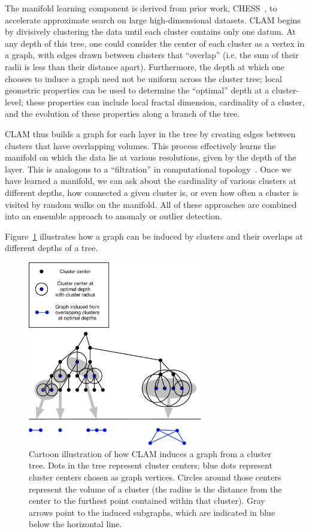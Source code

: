 The manifold learning component is derived from prior work, CHESS~\cite{ishaq2019entropy}, to accelerate approximate search on large high-dimensional datasets.
CLAM begins by divisively clustering the data until each cluster contains only one datum.
At any depth of this tree, one could consider the center of each cluster as a vertex in a graph, with edges drawn between clusters that ``overlap'' (i.e. the sum of their radii is less than their distance apart).
Furthermore, the depth at which one chooses to induce a graph need not be uniform across the cluster tree;
local geometric properties can be used to determine the ``optimal'' depth at a cluster-level;
these properties can include local fractal dimension, cardinality of a cluster, and the evolution of these properties along a branch of the tree.

CLAM thus builds a graph for each layer in the tree by creating edges between clusters that have overlapping volumes.
This process effectively learns the manifold on which the data lie at various resolutions, given by the depth of the layer.
This is analogous to a ``filtration'' in computational topology~\cite{carlsson2009topology}.
Once we have learned a manifold, we can ask about the cardinality of various clusters at different depths, how connected a given cluster is, or even how often a cluster is visited by random walks on the manifold.
All of these approaches are combined into an ensemble approach to anomaly or outlier detection.

Figure~\ref{fig:introduction:graph-generation} illustrates how a graph can be induced by clusters and their overlaps at different depths of a tree.

\begin{figure}[ht!]
    \centering
    \includegraphics[width=3in]{images/tree-graph.pdf}
    \caption{Cartoon illustration of how CLAM induces a graph from a cluster tree.
        Dots in the tree represent cluster centers;
        blue dots represent cluster centers chosen as graph vertices.
        Circles around those centers represent the volume of a cluster (the radius is the distance from the center to the furthest point contained within that cluster).
        Gray arrows point to the induced subgraphs, which are indicated in blue below the horizontal line.}
    \label{fig:introduction:graph-generation}
\end{figure}

